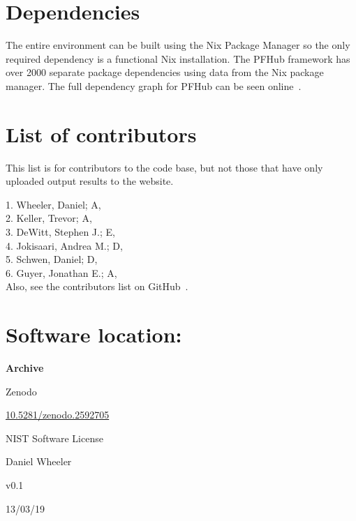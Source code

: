 \documentclass{jors}
\begin{document}
\section*{Dependencies}

The entire environment can be built using the Nix Package Manager so
the only required dependency is a functional Nix installation. The
PFHub framework has over 2000 separate package dependencies using
data from the Nix package manager. The full dependency graph for PFHub
can be seen online~\cite{dependencies}.

\section*{List of contributors}

This list is for contributors to the code base, but not those that
have only uploaded output results to the website.

1. Wheeler, Daniel; A,  \\
2. Keller, Trevor; A,  \\
3. DeWitt, Stephen J.; E,  \\
4. Jokisaari, Andrea M.; D,  \\
5. Schwen, Daniel; D,  \\
6. Guyer, Jonathan E.; A,  \\

Also, see the contributors list on GitHub~\cite{contributors}.

\section*{Software location:}

{\bf Archive}

\begin{description}[noitemsep,topsep=0pt]
	\item[Name:] Zenodo
	\item[Persistent identifier:]
          \href{https://dx.doi.org/10.5281/zenodo.2592705}{10.5281/zenodo.2592705}
	\item[Licence:] NIST Software License~\cite{nistlicense}
	\item[Publisher:]  Daniel Wheeler
	\item[Version published:] v0.1
	\item[Date published:] 13/03/19
\end{description}
\end{document}

